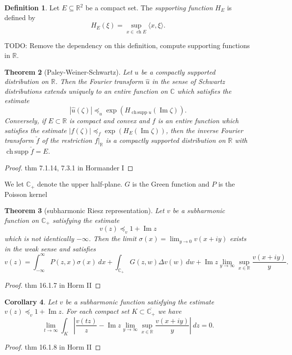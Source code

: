 \documentclass[12pt]{report}
\newcommand{\RR}{\mathbb{R}}
\newcommand{\CC}{\mathbb{C}}
\DeclareMathOperator{\ch}{ch}
\DeclareMathOperator*{\chsupp}{ch\,supp}
\renewcommand{\Im}{\operatorname{Im}}
\newcommand{\dfn}[1]{\emph{#1}\index{#1}}
\newtheorem{theorem}{Theorem}[chapter]
\newtheorem{corollary}[theorem]{Corollary}
\theoremstyle{definition}
\newtheorem{definition}[theorem]{Definition}
\begin{document}
\begin{definition}
    Let $E \subseteq \RR^2$ be a compact set. The \dfn{supporting function} $H_E$ is defined by
    $$H_E(\xi) = \sup_{x \in \ch E} \langle x, \xi \rangle.$$
\end{definition}
    TODO: Remove the dependency on this definition, compute supporting functions in $\RR$.

\begin{theorem}[Paley-Weiner-Schwartz]
    Let $u$ be a compactly supported distribution on $\RR$. Then the Fourier transform $\hat u$ in the sense of Schwartz distributions extends uniquely to an entire function on $\CC$ which satisfies the estimate
    $$|\hat u(\zeta)| \preceq_u \exp(H_{\chsupp u}(\Im \zeta)).$$
    Conversely, if $E \subset \RR$ is compact and convex and $f$ is an entire function which satisfies the estimate $|f(\zeta)| \preceq_f \exp(H_E(\Im \zeta))$, then the inverse Fourier transform $\check f$ of the restriction $f|_\RR$ is a compactly supported distribution on $\RR$ with $\chsupp \check f = E$.
\end{theorem}
\begin{proof}
    thm 7.1.14, 7.3.1 in Hormander I
\end{proof}

We let $\CC_+$ denote the upper half-plane. $G$ is the Green function and $P$ is the Poisson kernel
\begin{theorem}[subharmonic Riesz representation]
    Let $v$ be a subharmonic function on $\CC_+$ satisfying the estimate
    $$v(z) \preceq_v 1 + \Im z$$
    which is not identically $-\infty$. Then the limit $\sigma(x) = \lim_{y \to 0} v(x + iy)$ exists in the weak sense and satisfies
    $$v(z) = \int_{-\infty}^\infty P(z, x) \sigma(x) ~dx + \int_{\CC_+} G(z, w) \Delta v(w) ~dw + \Im z \lim_{y \to \infty} \sup_{x \in \RR} \frac{v(x + iy)}{y}.$$
\end{theorem}
\begin{proof}
    thm 16.1.7 in Horm II
\end{proof}

\begin{corollary}
    Let $v$ be a subharmonic function satisfying the estimate $v(z) \preceq_v 1 + \Im z$. For each compact set $K \subset \overline{\CC_+}$ we have
$$\lim_{t \to \infty} \int_K \left|\frac{v(tz)}{z} - \Im z \lim_{y \to \infty} \sup_{x \in \RR} \frac{v(x + iy)}{y}\right| ~dz = 0.$$
\end{corollary}
\begin{proof}
    thm 16.1.8 in Horm II
\end{proof}
\end{document}
